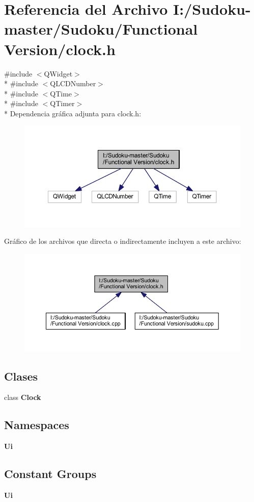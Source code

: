 \section{Referencia del Archivo I\-:/\-Sudoku-\/master/\-Sudoku/\-Functional Version/clock.h}
\label{clock_8h}
{\ttfamily \#include $<$Q\-Widget$>$}\\*
{\ttfamily \#include $<$Q\-L\-C\-D\-Number$>$}\\*
{\ttfamily \#include $<$Q\-Time$>$}\\*
{\ttfamily \#include $<$Q\-Timer$>$}\\*
Dependencia gráfica adjunta para clock.\-h\-:
\nopagebreak
\begin{figure}[H]
\begin{center}
\leavevmode
\includegraphics[width=350pt]{clock_8h__incl}
\end{center}
\end{figure}
Gráfico de los archivos que directa o indirectamente incluyen a este archivo\-:
\nopagebreak
\begin{figure}[H]
\begin{center}
\leavevmode
\includegraphics[width=350pt]{clock_8h__dep__incl}
\end{center}
\end{figure}
\subsection*{Clases}
\begin{DoxyCompactItemize}
\item 
class {\bf Clock}
\end{DoxyCompactItemize}
\subsection*{Namespaces}
\begin{DoxyCompactItemize}
\item 
{\bf Ui}
\end{DoxyCompactItemize}
\subsection*{Constant Groups}
\begin{DoxyCompactItemize}
\item 
{\bf Ui}
\end{DoxyCompactItemize}
